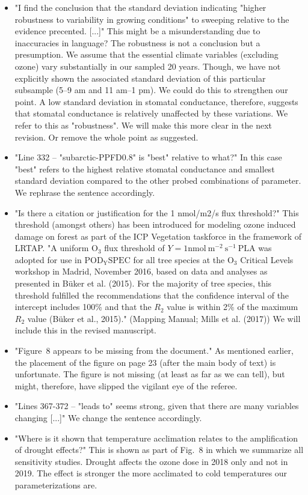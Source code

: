 \documentclass{scrartcl}
\begin{document}
\begin{itemize}
    \item {\color{blue} "I find the conclusion that the standard deviation indicating "higher robustness to variability in growing conditions" to sweeping relative to the evidence precented. [...]"} This might be a misunderstanding due to inaccuracies in language? The robustness is not a conclusion but a presumption. We assume that the essential climate variables (excluding ozone) vary substantially in our sampled 20 years. Though, we have not explicitly shown the associated standard deviation of this particular subsample (5--9 am and 11 am--1 pm). We could do this to strengthen our point. A low standard deviation in stomatal conductance, therefore, suggests that stomatal conductance is relatively unaffected by these variations. We refer to this as "robustness". We will make this more clear in the next revision. Or remove the whole point as suggested.
    \item {\color{blue} "Line 332 -- "subarctic-PPFD0.8" is "best" relative to what?"} In this case "best" refers to the highest relative stomatal conductance and smallest standard deviation compared to the other probed combinations of parameter. We rephrase the sentence accordingly.
    \item {\color{blue}"Is there a citation or justification for the 1 nmol/m2/s flux threshold?"} This threshold (amongst others) has been introduced for modeling ozone induced damage on forest as part of the ICP Vegetation taskforce in the framework of LRTAP. "A uniform $\mathrm{O_3}$ flux threshold of $Y=1 \mathrm{nmol~m^{-2}~s^{-1}~PLA}$ was adopted for use in $\mathrm{POD_Y SPEC}$ for all tree species at the $\mathrm{O_3}$ Critical Levels workshop in Madrid, November 2016, based on data and analyses as presented in Büker et al. (2015). For the majority of tree species, this threshold fulfilled the recommendations that the confidence interval of the intercept includes 100\% and that the $R_2$ value is within 2\% of the maximum $R_2$ value (Büker et al., 2015)." (Mapping Manual; Mills et al. (2017)) We will include this in the revised manuscript.
    \item {\color{blue}"Figure~8 appears to be missing from the document."} As mentioned earlier, the placement of the figure on page 23 (after the main body of text) is unfortunate. The figure is not missing (at least as far as we can tell), but might, therefore, have slipped the vigilant eye of the referee.
    \item {\color{blue}"Lines 367-372 -- "leads to" seems strong, given that there are many variables changing [...]"} We change the sentence accordingly.
    \item {\color{blue}"Where is it shown that temperature acclimation relates to the amplification of drought effects?"} This is shown as part of Fig.~8 in which we summarize all sensitivity studies. Drought affects the ozone dose in 2018 only and not in 2019. The effect is stronger the more acclimated to cold temperatures our parameterizations are.

\end{itemize}
\end{document}
